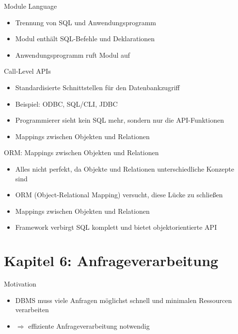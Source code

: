 \documentclass{article}
\begin{document}
\begin{block}{Module Language}
  \begin{itemize}
    \item Trennung von SQL und Anwendungsprogramm
    \item Modul enthält SQL-Befehle und Deklarationen
    \item Anwendungsprogramm ruft Modul auf
  \end{itemize}
\end{block}

\begin{block}{Call-Level APIs}
  \begin{itemize}
    \item Standardisierte Schnittstellen für den Datenbankzugriff
    \item Beispiel: ODBC, SQL/CLI, JDBC
    \item Programmierer sieht kein SQL mehr, sondern nur die API-Funktionen
    \item Mappings zwischen Objekten und Relationen
  \end{itemize}
\end{block}

\begin{block}{ORM: Mappings zwischen Objekten und Relationen}
  \begin{itemize}
    \item Alles nicht perfekt, da Objekte und Relationen unterschiedliche Konzepte sind
    \item ORM (Object-Relational Mapping) versucht, diese Lücke zu schließen
    \item Mappings zwischen Objekten und Relationen
    \item Framework verbirgt SQL komplett und bietet objektorientierte API
  \end{itemize}
\end{block}

\section{Kapitel 6: Anfrageverarbeitung}

\begin{block}{Motivation}
  \begin{itemize}
    \item DBMS muss viele Anfragen möglichst schnell und minimalen Ressourcen verarbeiten
    \item $\Rightarrow$ effiziente Anfrageverarbeitung notwendig
  \end{itemize}
\end{block}
\end{document}
